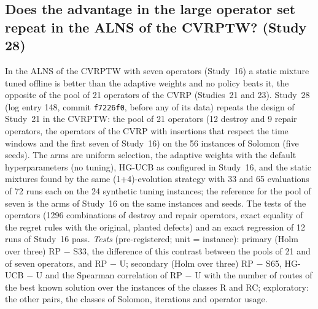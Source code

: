 \subsection{Does the advantage in the large operator set repeat in the ALNS of the CVRPTW? (Study 28)}\label{sec:s28design}
In the ALNS of the CVRPTW with seven operators (Study~16) a static mixture tuned offline is better than the adaptive weights and no policy beats it, the opposite of the pool of 21 operators of the CVRP (Studies~21 and 23). Study~28 (log entry 148, commit \texttt{f7226f0}, before any of its data) repeats the design of Study~21 in the CVRPTW: the pool of 21 operators (12 destroy and 9 repair operators, the operators of the CVRP with insertions that respect the time windows and the first seven of Study~16) on the 56 instances of Solomon (five seeds). The arms are uniform selection, the adaptive weights with the default hyperparameters (no tuning), HG-UCB as configured in Study~16, and the static mixtures found by the same (1+4)-evolution strategy with 33 and 65 evaluations of 72 runs each on the 24 synthetic tuning instances; the reference for the pool of seven is the arms of Study~16 on the same instances and seeds. The tests of the operators (1296 combinations of destroy and repair operators, exact equality of the regret rules with the original, planted defects) and an exact regression of 12 runs of Study~16 pass. \emph{Tests} (pre-registered; unit = instance): primary (Holm over three) RP $-$ S33, the difference of this contrast between the pools of 21 and of seven operators, and RP $-$ U; secondary (Holm over three) RP $-$ S65, HG-UCB $-$ U and the Spearman correlation of RP $-$ U with the number of routes of the best known solution over the instances of the classes R and RC; exploratory: the other pairs, the classes of Solomon, iterations and operator usage.

